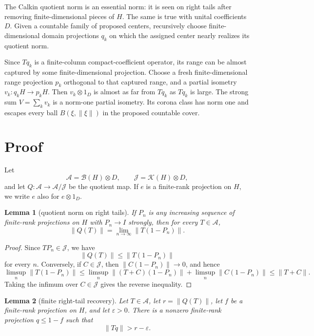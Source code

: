 \documentclass[11pt]{article}
\newtheorem{lemma}{Lemma}
\newcommand{\B}{\mathcal B}
\newcommand{\K}{\mathcal K}
\begin{document}
The Calkin quotient norm is an essential norm: it is seen on right tails after
removing finite-dimensional pieces of \(H\).  The same is true with unital
coefficients \(D\).  Given a countable family of proposed centers, recursively
choose finite-dimensional domain projections \(q_k\) on which the assigned
center nearly realizes its quotient norm.

Since \(Tq_k\) is a finite-column compact-coefficient operator, its range can
be almost captured by some finite-dimensional projection.  Choose a fresh
finite-dimensional range projection \(p_k\) orthogonal to that captured range,
and a partial isometry \(v_k:q_kH\to p_kH\).  Then \(v_k\otimes1_D\) is almost
as far from \(Tq_k\) as \(Tq_k\) is large.  The strong sum \(V=\sum_k v_k\) is
a norm-one partial isometry.  Its corona class has norm one and escapes every
ball \(B(\xi,\|\xi\|)\) in the proposed countable cover.

\section*{Proof}

Let
\[
        \mathcal A=\B(H)\otimes D,\qquad
        \mathcal J=\K(H)\otimes D,
\]
and let \(Q:\mathcal A\to \mathcal A/\mathcal J\) be the quotient map.  If
\(e\) is a finite-rank projection on \(H\), we write \(e\) also for
\(e\otimes 1_D\).

\begin{lemma}[quotient norm on right tails]
\label{lem:quotient-tail}
If \(P_n\) is any increasing sequence of finite-rank projections on \(H\) with
\(P_n\to I\) strongly, then for every \(T\in\mathcal A\),
\[
        \|Q(T)\|=\lim_{n\to\infty}\|T(1-P_n)\|.
\]
\end{lemma}

\begin{proof}
Since \(TP_n\in\mathcal J\), we have
\[
        \|Q(T)\|\le \|T(1-P_n)\|
\]
for every \(n\).  Conversely, if \(C\in\mathcal J\), then
\(\|C(1-P_n)\|\to0\), and hence
\[
        \limsup_n\|T(1-P_n)\|
        \le
        \limsup_n\|(T+C)(1-P_n)\|+\limsup_n\|C(1-P_n)\|
        \le \|T+C\|.
\]
Taking the infimum over \(C\in\mathcal J\) gives the reverse inequality.
\end{proof}

\begin{lemma}[finite right-tail recovery]
\label{lem:finite-tail}
Let \(T\in\mathcal A\), let \(r=\|Q(T)\|\), let \(f\) be a finite-rank
projection on \(H\), and let \(\varepsilon>0\).  There is a nonzero
finite-rank projection \(q\le1-f\) such that
\[
        \|Tq\|>r-\varepsilon.
\]
\end{lemma}
\end{document}
